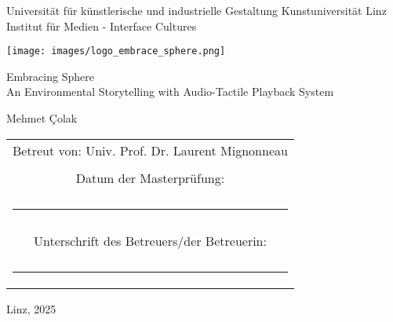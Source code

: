 \begin{titlepage}
    \centering

    {\large
    Universität für künstlerische und industrielle Gestaltung Kunstuniversität Linz\\
    Institut für Medien - Interface Cultures}
        
        \vspace{0.5cm}

        \texttt{[image: images/logo\_embrace\_sphere.png]}
        
        {\Huge Embracing Sphere\\[0.5cm]
        \Large An Environmental Storytelling with Audio-Tactile Playback System}

        \vspace{0.5cm}

        {\LARGE Mehmet Çolak}

        \vfill

        \begin{tabular}{c}
            \Large Betreut von: Univ. Prof. Dr. Laurent Mignonneau \\ \\
            \large Datum der Masterprüfung: \\ \\
            \rule{3cm}{0.1pt} \\ \\
            \large Unterschrift des Betreuers/der Betreuerin: \\ \\
            \rule{3cm}{0.1pt} \\
        \end{tabular}
        
        \vspace{1cm}
        
        {\small Linz, 2025}

\end{titlepage}